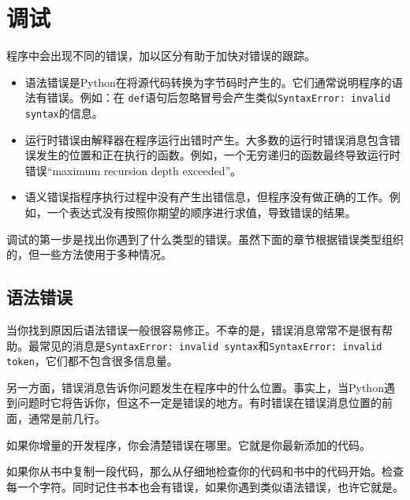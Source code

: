 \chapter{调试}


程序中会出现不同的错误，加以区分有助于加快对错误的跟踪。

\begin{itemize}

\item 语法错误是Python在将源代码转换为字节码时产生的。它们通常说明程序的语法有错误。例如：在 {\tt def}语句后忽略冒号会产生类似{\tt SyntaxError: invalid syntax}的信息。

\item 运行时错误由解释器在程序运行出错时产生。大多数的运行时错误消息包含错误发生的位置和正在执行的函数。例如，一个无穷递归的函数最终导致运行时错误“maximum recursion depth exceeded”。

\item 语义错误指程序执行过程中没有产生出错信息，但程序没有做正确的工作。例如，一个表达式没有按照你期望的顺序进行求值，导致错误的结果。

\end{itemize}


调试的第一步是找出你遇到了什么类型的错误。虽然下面的章节根据错误类型组织的，但一些方法使用于多种情况。


\section{语法错误}


当你找到原因后语法错误一般很容易修正。不幸的是，错误消息常常不是很有帮助。最常见的消息是{\tt SyntaxError: invalid syntax}和{\tt SyntaxError: invalid token}，它们都不包含很多信息量。

另一方面，错误消息告诉你问题发生在程序中的什么位置。事实上，当Python遇到问题时它将告诉你，但这不一定是错误的地方。有时错误在错误消息位置的前面，通常是前几行。


如果你增量的开发程序，你会清楚错误在哪里。它就是你最新添加的代码。

如果你从书中复制一段代码，那么从仔细地检查你的代码和书中的代码开始。检查每一个字符。同时记住书本也会有错误，如果你遇到类似语法错误，也许它就是。

